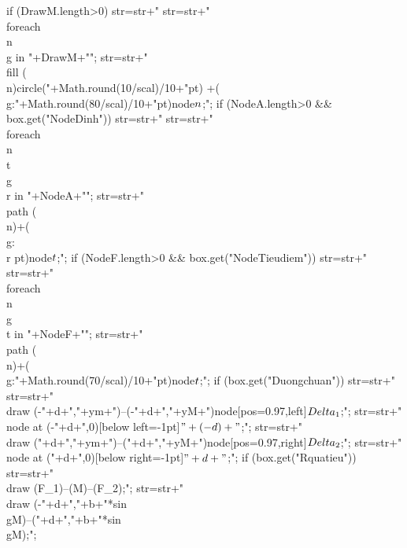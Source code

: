 {{{			if (DrawM.length>0) {
				str=str+"\n %
				str=str+"\n\\foreach \\n\\g in {"+DrawM+"}";
				str=str+"\n\\fill (\\n)circle("+Math.round(10/scal)/10+"pt) +(\\g:"+Math.round(80/scal)/10+"pt)node{$\\n$};";
			}
			if (NodeA.length>0 && box.get("NodeDinh")) {
				str=str+"\n %
				str=str+"\n\\foreach \\n\\t\\g\\r in {"+NodeA+"}";
				str=str+"\n\\path (\\n)+(\\g:\\r pt)node{$\\t$};";
			}
			if (NodeF.length>0 && box.get("NodeTieudiem")) {
				str=str+"\n %
				str=str+"\n\\foreach \\n\\g\\t in {"+NodeF+"}";
				str=str+"\n\\path (\\n)+(\\g:"+Math.round(70/scal)/10+"pt)node{$\\t$};";
			}
			if (box.get("Duongchuan")) {
				str=str+"\n %
				str=str+"\n\\draw (-"+d+","+ym+")--(-"+d+","+yM+")node[pos=0.97,left]{$\\Delta_1$};";
				str=str+"\n\\node at (-"+d+",0)[below left=-1pt]{$"+(-d)+"$};";
				str=str+"\n\\draw ("+d+","+ym+")--("+d+","+yM+")node[pos=0.97,right]{$\\Delta_2$};";
				str=str+"\n\\node at ("+d+",0)[below right=-1pt]{$"+d+"$};";
				if (box.get("Rquatieu")) {
					str=str+"\n\\draw (F_1)--(M)--(F_2);";
					str=str+"\n\\draw (-"+d+","+b+"*sin \\gM)--("+d+","+b+"*sin \\gM);";
}}}}}

